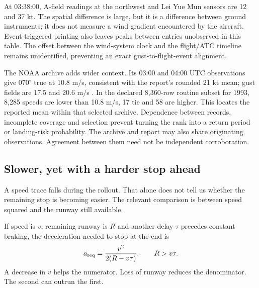 At 03:38:00, A-field readings at the northwest and Lei Yue Mun sensors are 12 and 37 kt. The spatial difference is large, but it is a difference between ground instruments; it does not measure a wind gradient encountered by the aircraft. Event-triggered printing also leaves peaks between entries unobserved in this table. The offset between the wind-system clock and the flight/ATC timeline remains unidentified, preventing an exact gust-to-flight-event alignment.

\FloatBarrier
The NOAA archive adds wider context. Its 03:00 and 04:00 UTC observations give $070^\circ$ true at 10.8 m/s, consistent with the report's rounded 21 kt mean; gust fields are 17.5 and 20.6 m/s \citep{noaa,isd}. In the declared 8,360-row routine subset for 1993, 8,285 speeds are lower than 10.8 m/s, 17 tie and 58 are higher. This locates the reported mean within that selected archive. Dependence between records, incomplete coverage and selection prevent turning the rank into a return period or landing-risk probability. The archive and report may also share originating observations. Agreement between them need not be independent corroboration.

\subsection*{Slower, yet with a harder stop ahead}
A speed trace falls during the rollout. That alone does not tell us whether the remaining stop is becoming easier. The relevant comparison is between speed squared and the runway still available.

If speed is $v$, remaining runway is $R$ and another delay $\tau$ precedes constant braking, the deceleration needed to stop at the end is
\begin{equation}
a_{\rm req}=\frac{v^2}{2(R-v\tau)},\qquad R>v\tau.
\label{eq:required}
\end{equation}
A decrease in $v$ helps the numerator. Loss of runway reduces the denominator. The second can outrun the first.



